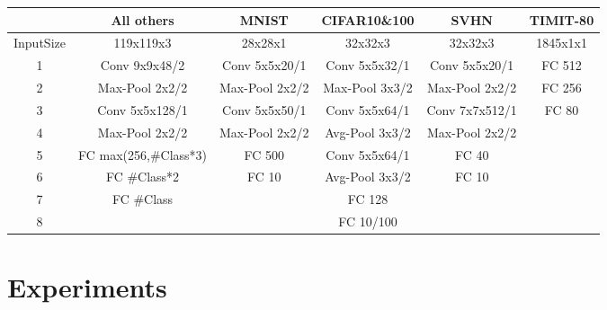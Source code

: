 \documentclass[letterpaper]{article}
\begin{document}
\begin {table*}
\centering
\begin{tabular}{  |c|c|c|c|c|c| }
 \hline
            & All others &        MNIST      &   CIFAR10\&100 & SVHN            & TIMIT-80  \\
 \hline
 \hline
 InputSize  & 119x119x3                 & 28x28x1           & 32x32x3        & 32x32x3         & 1845x1x1 \\
 \hline
 1          & Conv 9x9x48/2             & Conv 5x5x20/1     & Conv 5x5x32/1  & Conv 5x5x20/1   & FC 512 \\
\rowcolor{LightCyan}
 2          & Max-Pool 2x2/2            & Max-Pool 2x2/2    & Max-Pool 3x3/2 & Max-Pool 2x2/2  & FC 256 \\
 3          & Conv 5x5x128/1            & Conv 5x5x50/1     & Conv 5x5x64/1  & Conv 7x7x512/1  & FC 80 \\
\rowcolor{LightCyan}
 4          & Max-Pool 2x2/2            & Max-Pool 2x2/2    & Avg-Pool 3x3/2 & Max-Pool 2x2/2  & \\
 5          & FC max(256,\#Class*3)    & FC 500            & Conv 5x5x64/1  & FC 40           &        \\
\rowcolor{LightCyan}
 6          & FC \#Class*2             & FC 10             & Avg-Pool 3x3/2 & FC 10           & \\
 7          & FC \#Class               &                   & FC 128         &                 &   \\
\rowcolor{LightCyan}
 8          &                           &                   & FC 10/100      &                 & \\
 \hline
\end{tabular}
\caption {Network architectures used in the experiments: AxBxC/D means C feature maps of size AxB, with stride D. The CIFAR10\&100 architecture has a 2 units zero-padding for every convolution layer and 1 unit right-bottom zero-padding for every pooling layer. The other models do not have paddings. ``FC X'' denotes Fully Connected layer of X feature maps. In the first model, the number of hidden units in FC layers are chosen according to the number of classes (denoted by ``\#Class'') in the classification task. `` max(256,\#Class*3)'' denotes 256 or \#Class*3, whichever is larger. Rectified linear units (ReLU) are used as nonlinearities for all models.  } \label{tab:arch}
\end{table*}

\section{Experiments}
\label{sec:exp}
\end{document}
